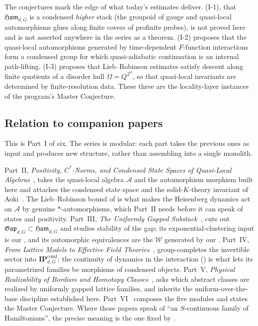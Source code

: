 \documentclass[12pt]{article}
\newcommand{\Ffun}{F}                          %
\newcommand{\Ham}{\mathfrak{Ham}}              %
\newcommand{\Gap}{\mathfrak{Gap}}              %
\newcommand{\Weq}{\mathcal{W}}                 %
\newcommand{\IPcond}{\mathbf{IP}^{\mathrm{cond}}}  %
\newcommand{\dis}{\Omega}                       %
\newcommand{\qA}{\mathcal{A}}
\newcommand{\Z}{\mathbb{Z}}
\theoremstyle{definition}
\theoremstyle{remark}
\begin{document}
The conjectures mark the edge of what today's estimates deliver.  (I-1), that
$\Ham_{d,G}$ is a condensed \emph{higher} stack (the groupoid of gauge and quasi-local
automorphisms glues along finite covers of profinite probes), is not proved here and is not
asserted anywhere in the series as a theorem.  (I-2) proposes that the
quasi-local automorphisms generated by time-dependent $\Ffun$-function interactions form a
condensed group for which quasi-adiabatic continuation is an internal path-lifting.
 (I-3) proposes that Lieb--Robinson estimates satisfy descent along finite
quotients of a disorder hull $\dis=Q^{\Z^d}$, so that quasi-local invariants are
determined by finite-resolution data. These three are the locality-layer instances of the
program's Master Conjecture.

\subsection{Relation to companion papers}
\label{sec:intro-companions}

This is Part~I of six. The series is modular: each part takes the previous ones as input and
produces new structure, rather than assembling into a single monolith.

Part~II, \emph{Positivity, $C^*$-Norms, and Condensed State Spaces of Quasi-Local
Algebras}~\cite{paperPositivity}, takes the quasi-local algebra $\qA$ and the automorphism
morphism built here and attaches the condensed state space and the solid-$K$-theory invariant
of Aoki~\cite{aoki-solidification}. The Lieb--Robinson bound of  is what
makes the Heisenberg dynamics act on $\qA$ by genuine $*$-automorphisms, which Part~II needs
before it can speak of states and positivity. Part~III, \emph{The Uniformly Gapped
Substack}~\cite{paperGap}, cuts out $\Gap_{d,G}\subset\Ham_{d,G}$ and studies stability of the gap;
its exponential-clustering input is our , and its automorphic
equivalences are the $\Weq$ generated by our . Part~IV, \emph{From Lattice
Models to Effective Field Theories}~\cite{paperEFT}, group-completes the invertible sector
into $\IPcond_{d,G}$; the continuity of dynamics in the interaction ()
is what lets its parametrized families be morphisms of condensed objects. Part~V,
\emph{Physical Realizability of Bordism and Homotopy Classes}~\cite{paperRealizability},
asks which abstract classes are realized by uniformly gapped lattice families, and inherits
the uniform-over-the-base discipline established here. Part~VI~\cite{paperSynthesis} composes
the five modules and states the Master Conjecture. Where those papers speak of ``an
$S$-continuous family of Hamiltonians'', the precise meaning is the one fixed by
.
\end{document}

